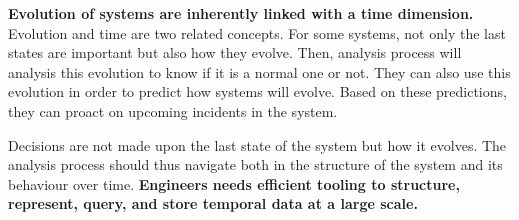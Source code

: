 \textbf{Evolution of systems are inherently linked with a time dimension.}
Evolution and time are two related concepts.
For some systems, not only the last states are important but also how they evolve.
Then, analysis process will analysis this evolution to know if it is a normal one or not.
They can also use this evolution in order to predict how systems will evolve.
Based on these predictions, they can proact on upcoming incidents in the system.

Decisions are not made upon the last state of the system but how it evolves.
The analysis process should thus navigate both in the structure of the system and its behaviour over time.
\textbf{Engineers needs efficient tooling to structure, represent, query, and store temporal data at a large scale.}





